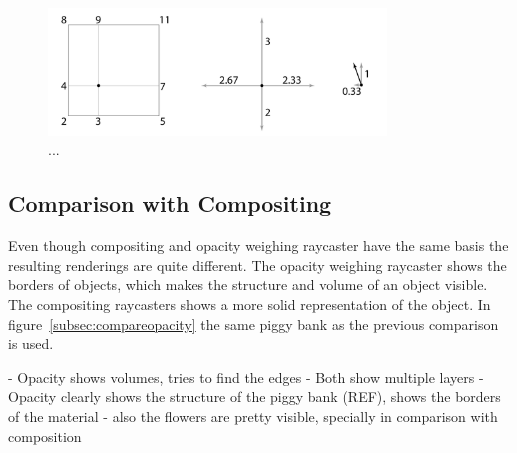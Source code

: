 

\begin{figure}[h!]
    \centering
    \captionsetup{justification=centering,margin=0.5cm}
    \includegraphics[width=0.8\textwidth]{img/local_gradient_vector.pdf}
    \caption{...}
    \label{fig:vector}
\end{figure}


\subsection{Comparison with Compositing}\label{subsec:opacity_compare}

Even though compositing and opacity weighing raycaster have the same basis the resulting renderings are quite different.
The opacity weighing raycaster shows the borders of objects, which makes the structure and volume of an object visible.
The compositing raycasters shows a more solid representation of the object.
In figure~\ref{subsec:compareopacity} the same piggy bank as the previous comparison is used.



- Opacity shows volumes, tries to find the edges
- Both show multiple layers
- Opacity clearly shows the structure of the piggy bank (REF), shows the borders of the material
- also the flowers are pretty visible, specially in comparison with composition




